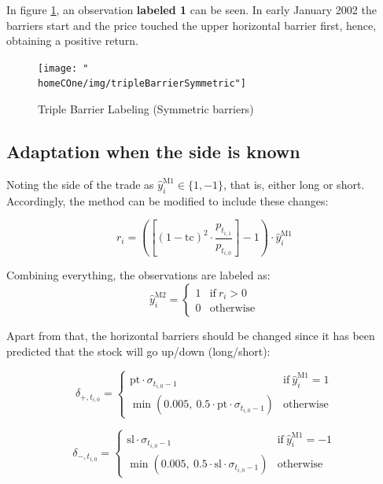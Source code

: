 \documentclass[a4paper]{article}
\newcommand{\homeCOne}{../../Chapter 1 - Metalabeling/Draft}
\begin{document}
In figure \ref{fig:tripleBarrierSymmetric}, an observation
\textbf{labeled 1} can be seen. In early January 2002 the barriers 
start and the price touched the upper horizontal barrier first, hence, 
obtaining a positive return.

\begin{figure}[htbp]
	\centering
	\texttt{[image: "\\homeCOne/img/tripleBarrierSymmetric"]}
	\caption{Triple Barrier Labeling (Symmetric barriers)}
	\label{fig:tripleBarrierSymmetric}
\end{figure}

\subsection{Adaptation when the side is known}
\label{sec:tripleBarrierSide}
Noting the side of the trade as $\hat{y}^{\text{M1}}_{i} \in 
\{1,-1\}$, that is, either long or short. Accordingly, the method can 
be modified to include these changes:

\begin{equation}
	r_i = \left( \left[ (1 - \text{tc})^2 \cdot 
	\frac{p_{t_{i,1}}}{p_{t_{i,0}}} \right] - 1 \right) \cdot 
	\hat{y}^{\text{M1}}_{i}
\end{equation}

Combining everything, the observations are labeled as:
\begin{equation}
	\hat{y}^{\text{M2}}_i =
    \begin{cases}
      1 & \text{if}\ r_i > 0 \\
      0 & \text{otherwise}
    \end{cases}
\end{equation}

Apart from that, the horizontal barriers should be changed since it 
has been predicted that the stock will go up/down (long/short):

\begin{equation}
	\delta_{+, t_{i,0}} =
    \begin{cases}
      \text{pt} \cdot \sigma_{t_{i,0}-1} & \text{if}\ 
      \hat{y}^{\text{M1}}_{i} = 1 \\
      \min(0.005,\ 0.5 \cdot \text{pt} \cdot \sigma_{t_{i,0}-1}) & 
      \text{otherwise}
    \end{cases}
\end{equation}

\begin{equation}
	\delta_{-, t_{i,0}} =
    \begin{cases}
      \text{sl} \cdot \sigma_{t_{i,0}-1} & \text{if}\ 
      \hat{y}^{\text{M1}}_{i} = -1 \\
      \min(0.005,\ 0.5 \cdot \text{sl} \cdot \sigma_{t_{i,0}-1}) & 	
      \text{otherwise}
    \end{cases}
\end{equation}
\end{document}
